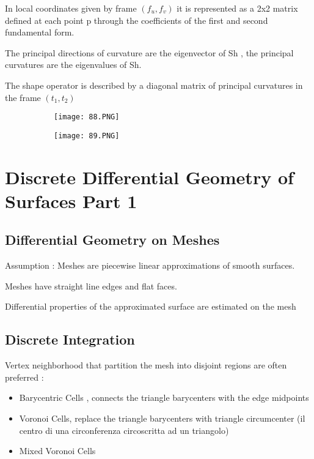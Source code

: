 \documentclass{article}
\begin{document}
In local coordinates given by frame $(f_u,f_v)$ it is represented as a 2x2 matrix defined at each point p through the coefficients of the first and second fundamental form.

The principal directions of curvature are the eigenvector of Sh , the principal curvatures are the eigenvalues of Sh.

The shape operator is described by a diagonal matrix of principal curvatures in the frame $(t_1,t_2)$


\begin{figure}[ht!]
  \centering
  \begin{subfigure}[b]{0.49\linewidth}
    \texttt{[image: 88.PNG]}
  \end{subfigure}
     \begin{subfigure}[b]{0.49\textwidth}
         \centering
         \texttt{[image: 89.PNG]}
     \end{subfigure}
\end{figure}

\section{Discrete Differential Geometry of Surfaces Part 1}

\subsection{Differential Geometry on Meshes}

Assumption : Meshes are piecewise linear approximations of smooth surfaces.

Meshes have straight line edges and flat faces.

Differential properties of the approximated surface are estimated on the mesh

\subsection{Discrete Integration}

Vertex neighborhood that partition the mesh into disjoint regions are often preferred :

\begin{itemize}
    \item Barycentric Cells , connects the triangle barycenters  with the edge midpoints
    \item Voronoi Cells, replace the triangle barycenters with triangle circumcenter (il centro di una circonferenza circoscritta ad un triangolo)
    \item Mixed Voronoi Cells
\end{itemize}
\end{document}
